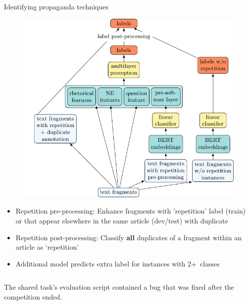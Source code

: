 \documentclass[final]{beamer}
\newlength{\onecolwid}
\newlength{\twocolwid}
\begin{document}
\begin{frame}[t]
\begin{columns}[t]
\begin{column}{\twocolwid}
\begin{columns}[t,totalwidth=\twocolwid]
\begin{column}{\onecolwid}
\begin{block}{Identifying propaganda techniques}
\vspace{-0.2em}
\begin{figure}
    \includegraphics[width=1\textwidth,trim={6mm 0 0 0},clip]{task2-system.pdf}
\end{figure}
\vspace{0.2em}
\begin{itemize}
    \item Repetition pre-processing: Enhance fragments with 'repetition' label (train) or that appear elsewhere in the same article (dev/test) with duplicate
    \item Repetition post-processing: Classify \textbf{all} duplicates of a fragment within an article as `repetition'
    \item Additional model predicts extra label for instances with 2+~classes
\end{itemize}
\end{block}
\end{column}
\end{columns}
{\normalsize *The shared task's evaluation script contained a bug that was fixed after the competition ended.}
\end{column} 


\end{columns}
\end{frame}
\end{document}
